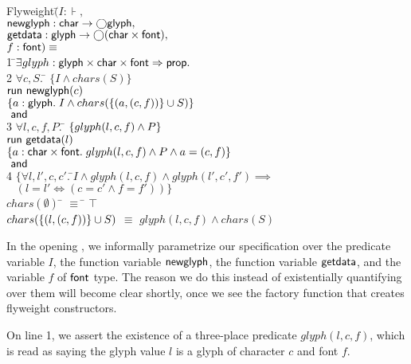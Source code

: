 \documentclass[preprint,natbib]{sigplanconf}
\begin{document}
{\small
\begin{tabbing}
Flyweight$($\=$I : \assert,\;\; $\\
\> $\mbox{\textsf{{newglyph}}} : \mbox{\textsf{{char}}} \to \bigcirc{\mbox{\textsf{{glyph}}}},$ \\
\> $\mbox{\textsf{{getdata}}} : \mbox{\textsf{{glyph}}} \to \bigcirc{(\mbox{\textsf{{char}}}\times \mbox{\textsf{{font}}})},$ \\
\> $f:\mbox{\textsf{{font}}}) \equiv$ \\
1 \qquad \=$\exists $\=$glyph : \mbox{\textsf{{glyph}}} \times \mbox{\textsf{{char}}} \times \mbox{\textsf{{font}}} \Rightarrow \mbox{\textsf{{prop}}}.$ 
\\[0.5em]

2  \> \> $\forall c, S.\;$\=
         $\{I \land chars(S)\}$ \\
   \>\>\>$\mbox{\textsf{{run }}}{\mbox{\textsf{{newglyph}}}(c)}$ \\
   \>\>\>$\{{a:\mbox{\textsf{{glyph}}}.\; 
                 I \land chars(\{{(a, (c,f))}\} \cup S)}\}$ \\
  \> \!$\mbox{\textsf{{ and }}}$ \\
3 \> $\forall l, c, f, P.\;$\=
     $\{{glyph(l, c, f) \land P}\}$ \\
\>\> $\mbox{\textsf{{run }}}{\mbox{\textsf{{getdata}}}(l)}$ \\
\>\> $\{{a:\mbox{\textsf{{char}}} \times \mbox{\textsf{{font}}}.\; glyph(l, c, f) \land P \land a = (c,f)}\}$
\\
  \> \!$\mbox{\textsf{{ and }}}$ \\
4 \> $\{\forall l, l', c, c'.\;$\=$I \land glyph(l,c,f) \land glyph(l',c',f')
 \implies $ \\
\>\>  $\;\;\;\left(l = l' \iff (c = c'\land f=f')\right)\}$ \\[0.5em]

$chars(\emptyset)$ \qquad\qquad\qquad \;\;\= $\equiv$ \= $\top$ \\
$chars(\{{(l,(c,f))}\} \cup S)$ \> $\equiv$ \> $glyph(l,c,f) \land chars(S)$ \\
\end{tabbing}
}

In the opening , we informally parametrize our specification over the
predicate variable $I$, the function variable $\mbox{\textsf{{newglyph}}}$, the
function variable $\mbox{\textsf{{getdata}}}$, and the variable $f$ of $\mbox{\textsf{{font}}}$
type. The reason we do this instead of existentially quantifying over
them will become clear shortly, once we see the factory function that
creates flyweight constructors.

On line 1, we assert the existence of a three-place predicate
$glyph(l, c, f)$, which is read as saying the glyph value $l$ is a
glyph of character $c$ and font $f$. 
\end{document}

